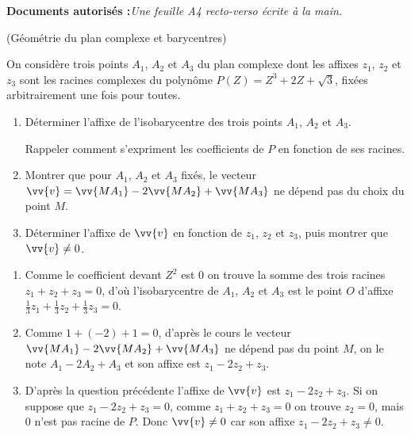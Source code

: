 \documentclass[a4paper,12pt,reqno]{amsart}
\begin{document}
\ifsolutions\else
\textbf{Documents autorisés :}\textit{Une feuille A4 recto-verso écrite à la main.}

\vspace{28mm}
\tsvp
\fi

\begin{exo} (Géométrie du plan complexe et barycentres)

  On considère trois points $A_{1}$, $A_{2}$ et $A_{3}$ du plan complexe dont les affixes $z_{1}$, $z_{2}$ et $z_{3}$ sont les racines complexes du polynôme $P(Z) = Z^{3} + 2Z + \sqrt{3}$, fixées arbitrairement une fois pour toutes.
  \begin{enumerate}
    \item Déterminer l'affixe de l'isobarycentre des trois points $A_{1}$, $A_{2}$ et $A_{3}$.\\
    \begin{indication}
      Rappeler comment s'expriment les coefficients de $P$ en fonction de ses racines.
    \end{indication}
    \item Montrer que pour $A_{1}$, $A_{2}$ et $A_{3}$ fixés, le vecteur $\vv{v} = \vv{MA_{1}} - 2\vv{MA_{2}}+\vv{MA_{3}}$ ne dépend pas du choix du point $M$.
    \item Déterminer l'affixe de $\vv{v}$ en fonction de $z_{1}$, $z_{2}$ et $z_{3}$, puis montrer que $\vv{v} \neq 0$.
   \end{enumerate}

\end{exo}

\begin{solution}
  \begin{enumerate}
    \item Comme le coefficient devant $Z^{2}$ est $0$ on trouve la somme des trois racines $z_{1}+z_{2}+z_{3} = 0$, d'où l'isobarycentre de $A_{1}$, $A_{2}$ et $A_{3}$ est le point $O$ d'affixe $\frac{1}{3}z_{1}+\frac{1}{3}z_{2}+\frac{1}{3}z_{3}=0$.
    \item Comme $1+(-2)+1=0$, d'après le cours le vecteur $\vv{MA_{1}} - 2\vv{MA_{2}}+\vv{MA_{3}}$ ne dépend pas du point $M$, on le note $A_{1} - 2A_{2}+A_{3}$ et son affixe est $z_{1} - 2z_{2}+z_{3}$.
    \item D'après la question précédente l'affixe de $\vv{v}$ est $z_{1} - 2z_{2}+z_{3}$. Si on suppose que $z_{1} - 2z_{2}+z_{3}=0$, comme $z_{1}+z_{2}+z_{3} = 0$ on trouve $z_{2}=0$, mais $0$ n'est pas racine de $P$. Donc $\vv{v}\neq 0$ car son affixe $z_{1} - 2z_{2}+z_{3}\neq 0$.
  \end{enumerate}
\end{solution}
\end{document}
